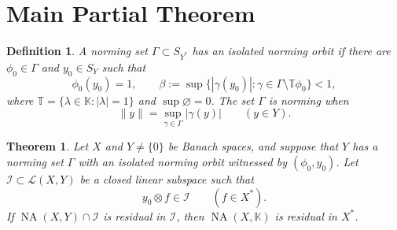 \documentclass[11pt]{article}
\newtheorem{theorem}{Theorem}
\newtheorem{definition}{Definition}
\newcommand{\K}{\mathbb K}
\newcommand{\T}{\mathbb T}
\newcommand{\NA}{\operatorname{NA}}
\newcommand{\calL}{\mathcal L}
\newcommand{\norm}[1]{\lVert #1\rVert}
\begin{document}
\section*{Main Partial Theorem}

\begin{definition}
A norming set \(\Gamma\subset S_{Y^*}\) has an \emph{isolated norming orbit}
if there are \(\phi_0\in\Gamma\) and \(y_0\in S_Y\) such that
\[
 \phi_0(y_0)=1,\qquad
 \beta:=\sup\{|\gamma(y_0)|:
       \gamma\in\Gamma\setminus\T\phi_0\}<1,
 \tag{1}\label{eq:gap}
\]
where \(\T=\{\lambda\in\K:|\lambda|=1\}\) and \(\sup\varnothing=0\).  The set
\(\Gamma\) is norming when
\[
 \norm y=\sup_{\gamma\in\Gamma}|\gamma(y)|\qquad(y\in Y).
\]
\end{definition}

\begin{theorem}\label{thm:main}
Let \(X\) and \(Y\neq\{0\}\) be Banach spaces, and suppose that \(Y\) has a
norming set \(\Gamma\) with an isolated norming orbit witnessed by
\((\phi_0,y_0)\).  Let \(\mathcal I\subset\calL(X,Y)\) be a closed linear
subspace such that
\[
 y_0\otimes f\in\mathcal I\qquad(f\in X^*).
 \tag{2}\label{eq:rankone}
\]
If \(\NA(X,Y)\cap\mathcal I\) is residual in \(\mathcal I\), then
\(\NA(X,\K)\) is residual in \(X^*\).
\end{theorem}
\end{document}
